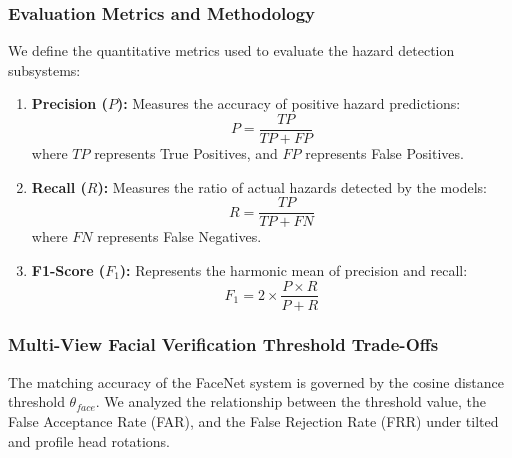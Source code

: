 \documentclass[12pt,a4paper]{article}
\begin{document}
\begin{table}[h]
    \centering
    \caption{Fire and Smoke Detection Model Comparison}
    \label{tab:fire_comparison}
\end{table}

\subsubsection{Evaluation Metrics and Methodology}
We define the quantitative metrics used to evaluate the hazard detection subsystems:
\begin{enumerate}
    \item \textbf{Precision ($P$):} Measures the accuracy of positive hazard predictions:
    \begin{equation}
        P = \frac{TP}{TP + FP}
    \end{equation}
    where $TP$ represents True Positives, and $FP$ represents False Positives.
    
    \item \textbf{Recall ($R$):} Measures the ratio of actual hazards detected by the models:
    \begin{equation}
        R = \frac{TP}{TP + FN}
    \end{equation}
    where $FN$ represents False Negatives.
    
    \item \textbf{F1-Score ($F_1$):} Represents the harmonic mean of precision and recall:
    \begin{equation}
        F_1 = 2 \times \frac{P \times R}{P + R}
    \end{equation}
\end{enumerate}

\subsubsection{Multi-View Facial Verification Threshold Trade-Offs}
The matching accuracy of the FaceNet system is governed by the cosine distance threshold $\theta_{face}$. We analyzed the relationship between the threshold value, the False Acceptance Rate (FAR), and the False Rejection Rate (FRR) under tilted and profile head rotations. 
\end{document}
